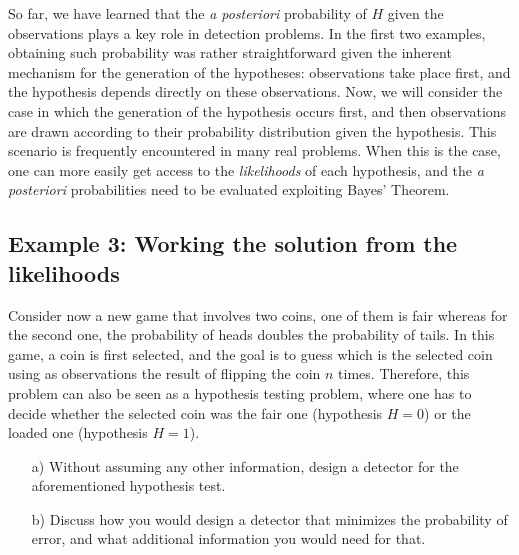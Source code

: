 So far, we have learned that the {\em a posteriori} probability of $H$ given the observations plays a key role in detection problems. In the first two examples, obtaining such probability was rather straightforward given the inherent mechanism for the generation of the hypotheses: observations take place first, and the hypothesis depends directly on these observations. Now, we will consider the case in which the generation of the hypothesis occurs first, and then observations are drawn according to their probability distribution given the hypothesis. This scenario is frequently encountered in many real problems. When this is the case, one can more easily get access to the {\em likelihoods} of each hypothesis, and the {\em a posteriori} probabilities need to be evaluated exploiting Bayes' Theorem.

\subsection{Example 3: Working the solution from the likelihoods}
\label{subsec:example3}

\begin{problem}
	Consider now a new game that involves two coins, one of them is fair whereas for the second one, the probability of heads doubles the probability of tails. In this game, a coin is first selected, and the goal is to guess which is the selected coin using as observations the result of flipping the coin $n$ times. Therefore, this problem can also be seen as a hypothesis testing problem, where one has to decide whether the selected coin was the fair one (hypothesis $H=0$) or the loaded one (hypothesis $H=1$).
	
	\begin{itemize}
		\item [a)] Without assuming any other information, design a detector for the aforementioned hypothesis test.
		\item [b)] Discuss how you would design a detector that minimizes the probability of error, and what additional information you would need for that.
	\end{itemize}
\end{problem}

